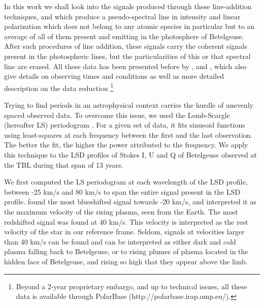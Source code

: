 \documentclass{aa}
\begin{document}
In this work we shall look into the signals produced through these line-addition techniques, and which produce a pseudo-spectral line in intensity 
and linear polarization which does not belong to any atomic species in particular but to an average of all of them present and emitting in the 
photosphere of Betelgeuse. After such procedures of line addition, these signals carry the coherent signals present in the photospheric lines, but the particularities of this or 
that spectral line are erased. All these data has been presented before by \cite{auriere_discovery_2016}, \cite{mathias_evolution_2018} and 
\cite{lopez_ariste_three-dimensional_2022}, which also give details on observing times and conditions as well as more detailed description 
on the data reduction \footnote[1]{Beyond a 2-year proprietary embargo, and up to technical issues, all these data is available through 
PolarBase (http://polarbase.irap.omp.eu/).}




Trying to find periods in an astrophysical context carries the hurdle of unevenly spaced observed data. To overcome this issue, 
we used the Lomb-Scargle (hereafter LS) periodogram \citep{lomb_least-squares_1976,scargle_studies_1982}. For a given set of data, it fits sinusoid functions 
using least-squares at each frequency between the first and the last observation. The better the fit, the higher the power attributed to the frequency. 
We apply this technique to the  LSD profiles of Stokes I, U and Q of Betelgeuse observed at the TBL during 
that span of 13 years. 


We first computed the LS periodogram at each wavelength of the LSD profile, between -25 km/s and 80 km/s to span the entire 
signal present in the LSD profile. \cite{lopez_ariste_convective_2018} found the most blueshifted signal towards -20 km/s, 
and interpreted it as  the maximum velocity of the rising plasma, seen from the Earth. The most redshifted signal was found at 40 km/s. 
This velocity is interpreted
as the rest velocity of the star in our reference frame. Seldom, signals at velocities larger than 40 km/s can be found 
and can be interpreted as either dark and cold plasma falling back to Betelgeuse, 
or to rising plumes of plasma located in the hidden face of Betelgeuse,
and rising so high that they appear above the limb.
\end{document}
